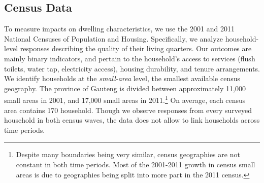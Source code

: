 \documentclass[12pt]{article}
\begin{document}

\subsection{Census Data}

To measure impacts on dwelling characteristics, we use the 2001 and 2011 National Censuses of Population and Housing. Specifically, we analyze household-level responses describing the quality of their living quarters. Our outcomes are mainly binary indicators, and pertain to the household's access to services (flush toilets, water tap, electricity access), housing durability, and tenure arrangements. We identify households at the {\it small-area} level, the smallest available census geography. The province of Gauteng is divided between approximately 11,000 small areas in 2001, and 17,000 small areas in 2011.\footnote{Despite many boundaries being very similar, census geographies are not constant in both time periods. Most of the 2001-2011 growth in census small areas is due to geographies being split into more part in the 2011 census.} On average, each census area contains 170 household. Though we observe responses from every surveyed household in both census waves, the data does not allow to link households across time periods. 
\end{document}
